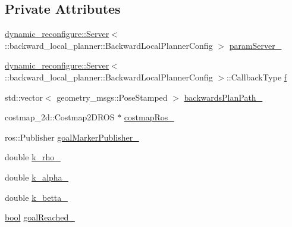 \subsection*{Private Attributes}
\begin{DoxyCompactItemize}
\item 
\hyperlink{odom__tracker__node_8cpp_a9884574d0480319430f628f79afc0500}{dynamic\+\_\+reconfigure\+::\+Server}$<$\+::backward\+\_\+local\+\_\+planner\+::\+Backward\+Local\+Planner\+Config $>$ \hyperlink{classmove__base__z__client_1_1backward__local__planner_1_1BackwardLocalPlanner_ab4e01416e0e6d79c00daaf7b2b9aae78}{param\+Server\+\_\+}
\item 
\hyperlink{odom__tracker__node_8cpp_a9884574d0480319430f628f79afc0500}{dynamic\+\_\+reconfigure\+::\+Server}$<$\+::backward\+\_\+local\+\_\+planner\+::\+Backward\+Local\+Planner\+Config $>$\+::Callback\+Type \hyperlink{classmove__base__z__client_1_1backward__local__planner_1_1BackwardLocalPlanner_a8851653bff38ab410bda8aca0ba32574}{f}
\item 
std\+::vector$<$ geometry\+\_\+msgs\+::\+Pose\+Stamped $>$ \hyperlink{classmove__base__z__client_1_1backward__local__planner_1_1BackwardLocalPlanner_a451add2af7d6d83a7415277311b3ed04}{backwards\+Plan\+Path\+\_\+}
\item 
costmap\+\_\+2d\+::\+Costmap2\+D\+R\+OS $\ast$ \hyperlink{classmove__base__z__client_1_1backward__local__planner_1_1BackwardLocalPlanner_a865618f84238fe6ff437d1e38ec5fec0}{costmap\+Ros\+\_\+}
\item 
ros\+::\+Publisher \hyperlink{classmove__base__z__client_1_1backward__local__planner_1_1BackwardLocalPlanner_a7228d3fe90bc48b486e5c46d6ac5e815}{goal\+Marker\+Publisher\+\_\+}
\item 
double \hyperlink{classmove__base__z__client_1_1backward__local__planner_1_1BackwardLocalPlanner_a9ae9a8c4c4663a999ba107aea9f6868d}{k\+\_\+rho\+\_\+}
\item 
double \hyperlink{classmove__base__z__client_1_1backward__local__planner_1_1BackwardLocalPlanner_ac859500c0329247de08daf864fd2d4b1}{k\+\_\+alpha\+\_\+}
\item 
double \hyperlink{classmove__base__z__client_1_1backward__local__planner_1_1BackwardLocalPlanner_aa2f7fe022cdc4eb11c17f6f576c732c6}{k\+\_\+betta\+\_\+}
\item 
\hyperlink{classbool}{bool} \hyperlink{classmove__base__z__client_1_1backward__local__planner_1_1BackwardLocalPlanner_a0a89141d3d3a8ebfb9e1d69d0d33fd49}{goal\+Reached\+\_\+}
\item 

\end{DoxyCompactItemize}
